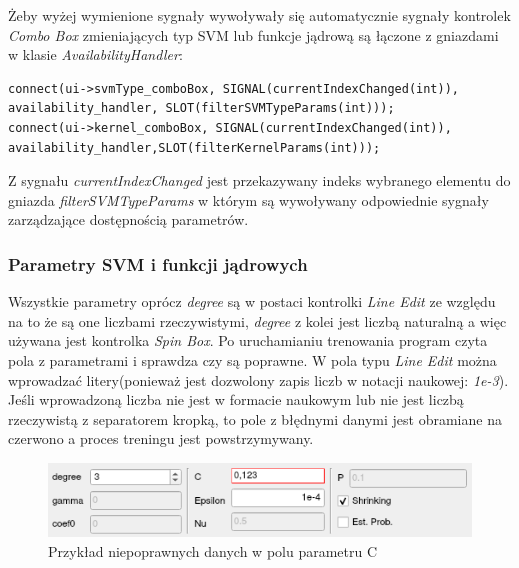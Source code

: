 \documentclass[paper=a4, fontsize=11pt]{scrartcl} %
\numberwithin{equation}{section} %
\numberwithin{figure}{section} %
\begin{document}
    \par Żeby wyżej wymienione sygnały wywoływały się automatycznie sygnały kontrolek
    \textit{Combo Box} zmieniających typ SVM lub funkcje jądrową są łączone z gniazdami w
    klasie \textit{AvailabilityHandler}:

    \begin{lstlisting}
connect(ui->svmType_comboBox, SIGNAL(currentIndexChanged(int)), availability_handler, SLOT(filterSVMTypeParams(int)));
connect(ui->kernel_comboBox, SIGNAL(currentIndexChanged(int)), availability_handler,SLOT(filterKernelParams(int)));
    \end{lstlisting}

    \par Z sygnału \textit{currentIndexChanged} jest przekazywany indeks wybranego elementu do
    gniazda \textit{filterSVMTypeParams} w którym są wywoływany odpowiednie sygnały
    zarządzające dostępnością parametrów.


\subsubsection{Parametry SVM i funkcji jądrowych}

    \par Wszystkie parametry oprócz \textit{degree} są w postaci kontrolki \textit{Line Edit} ze
    względu na to że są one liczbami rzeczywistymi, \textit{degree} z kolei jest liczbą
    naturalną a więc używana jest kontrolka \textit{Spin Box}. Po uruchamianiu trenowania
    program czyta pola z parametrami i sprawdza czy są poprawne. W pola typu
    \textit{Line Edit} można wprowadzać litery(ponieważ jest dozwolony zapis liczb w notacji
    naukowej: \textit{1e-3}). Jeśli wprowadzoną liczba nie jest w formacie naukowym lub nie
    jest liczbą rzeczywistą z separatorem kropką, to pole z błędnymi danymi jest obramiane na
    czerwono a proces treningu jest powstrzymywany.

    \begin{figure}[h]
        \begin{center}
            \includegraphics[scale=1.0]{./img/svm_app_param_wrong.png}
            \caption{Przykład niepoprawnych danych w polu parametru C}
            \label{fig:param_wrong}
        \end{center}
    \end{figure}
\end{document}
